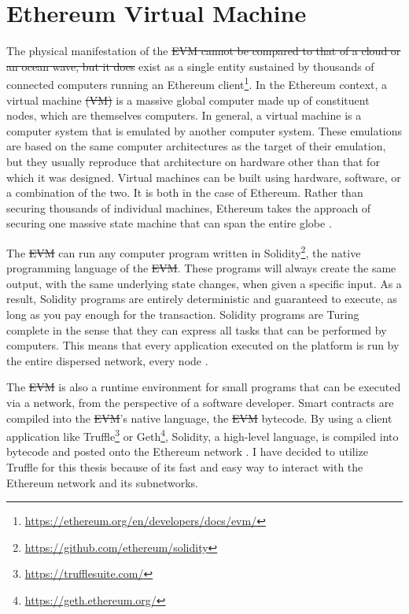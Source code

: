 \documentclass[final]{vutinfth}
\providecommand{\DIFaddtex}[1]{{\protect\color{blue}\uwave{#1}}} %
\providecommand{\DIFdeltex}[1]{{\protect\color{red}\sout{#1}}}                      %
\providecommand{\DIFaddbegin}{} %
\providecommand{\DIFaddend}{} %
\providecommand{\DIFdelbegin}{} %
\providecommand{\DIFdelend}{} %
\providecommand{\DIFadd}[1]{\texorpdfstring{\DIFaddtex{#1}}{#1}} %
\providecommand{\DIFdel}[1]{\texorpdfstring{\DIFdeltex{#1}}{}} %
\begin{document}
\section{Ethereum Virtual Machine \DIFaddbegin \DIFadd{(EVM)}\DIFaddend }
\label{sec:evm}
The physical manifestation of the \DIFdelbegin \DIFdel{EVM cannot be compared to that of a cloud or an ocean wave, but it does }\DIFdelend \DIFaddbegin \DIFadd{\acrshort{evm} }\DIFaddend exist as a single entity sustained by thousands of connected computers running an Ethereum client\footnote{\url{https://ethereum.org/en/developers/docs/evm/}}.
In the Ethereum context, a virtual machine \DIFdelbegin \DIFdel{(VM) }\DIFdelend is a massive global computer made up of constituent nodes, which are themselves computers. In general, a virtual machine is a computer system that is emulated by another computer system. These emulations are based on the same computer architectures as the target of their emulation, but they usually reproduce that architecture on hardware other than that for which it was designed. Virtual machines can be built using hardware, software, or a combination of the two. It is both in the case of Ethereum. Rather than securing thousands of individual machines, Ethereum takes the approach of securing one massive state machine that can span the entire globe \cite[48]{dannen2017introducing}.

The \DIFdelbegin \DIFdel{EVM }\DIFdelend \DIFaddbegin \DIFadd{\acrshort{evm} }\DIFaddend can run any computer program written in Solidity\footnote{\url{https://github.com/ethereum/solidity}}, the native programming language of the \DIFdelbegin \DIFdel{EVM}\DIFdelend \DIFaddbegin \DIFadd{\acrshort{evm}}\DIFaddend . These programs will always create the same output, with the same underlying state changes, when given a specific input. As a result, Solidity programs are entirely deterministic and guaranteed to execute, as long as you pay enough for the transaction. Solidity programs are Turing complete in the sense that they can express all tasks that can be performed by computers. This means that every application executed on the platform is run by the entire dispersed network, every node \cite[50]{dannen2017introducing}.

The \DIFdelbegin \DIFdel{EVM }\DIFdelend \DIFaddbegin \DIFadd{\acrshort{evm} }\DIFaddend is also a runtime environment for small programs that can be executed via a network, from the perspective of a software developer. Smart contracts are compiled into the \DIFdelbegin \DIFdel{EVM}\DIFdelend \DIFaddbegin \DIFadd{\acrshort{evm}}\DIFaddend 's native language, the \DIFdelbegin \DIFdel{EVM }\DIFdelend \DIFaddbegin \DIFadd{\acrshort{evm} }\DIFaddend bytecode. By using a client application like Truffle\footnote{\url{https://trufflesuite.com/}} or Geth\footnote{\url{https://geth.ethereum.org/}}, Solidity, a high-level language, is compiled into bytecode and posted onto the Ethereum network \cite[51]{dannen2017introducing}. I have decided to utilize Truffle for this thesis because of its fast and easy way to interact with the Ethereum network and its subnetworks.
\end{document}
